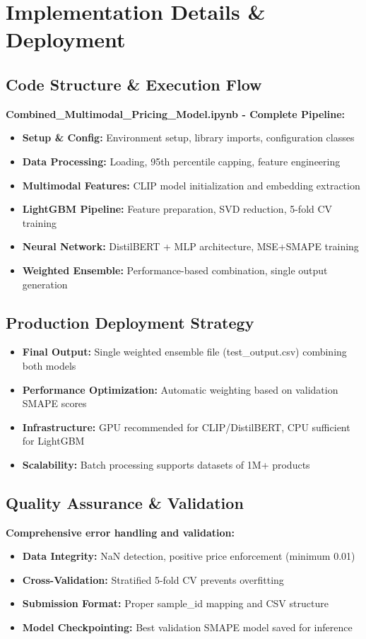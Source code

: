 \documentclass[10pt,a4paper]{article}
\begin{document}
\section{\textcolor{primarycolor}{Implementation Details \& Deployment}}

\subsection{Code Structure \& Execution Flow}
\textbf{Combined\_Multimodal\_Pricing\_Model.ipynb - Complete Pipeline:}
\begin{itemize}[itemsep=0.1em]
    \item \textbf{Setup \& Config:} Environment setup, library imports, configuration classes
    \item \textbf{Data Processing:} Loading, 95th percentile capping, feature engineering
    \item \textbf{Multimodal Features:} CLIP model initialization and embedding extraction
    \item \textbf{LightGBM Pipeline:} Feature preparation, SVD reduction, 5-fold CV training
    \item \textbf{Neural Network:} DistilBERT + MLP architecture, MSE+SMAPE training
    \item \textbf{Weighted Ensemble:} Performance-based combination, single output generation
\end{itemize}

\subsection{Production Deployment Strategy}
\begin{itemize}[itemsep=0.1em]
    \item \textbf{Final Output:} Single weighted ensemble file (test\_output.csv) combining both models
    \item \textbf{Performance Optimization:} Automatic weighting based on validation SMAPE scores
    \item \textbf{Infrastructure:} GPU recommended for CLIP/DistilBERT, CPU sufficient for LightGBM
    \item \textbf{Scalability:} Batch processing supports datasets of 1M+ products
\end{itemize}

\subsection{Quality Assurance \& Validation}
\textbf{Comprehensive error handling and validation:}
\begin{itemize}[itemsep=0.1em]
    \item \textbf{Data Integrity:} NaN detection, positive price enforcement (minimum 0.01)
    \item \textbf{Cross-Validation:} Stratified 5-fold CV prevents overfitting
    \item \textbf{Submission Format:} Proper sample\_id mapping and CSV structure
    \item \textbf{Model Checkpointing:} Best validation SMAPE model saved for inference
\end{itemize}
\end{document}
